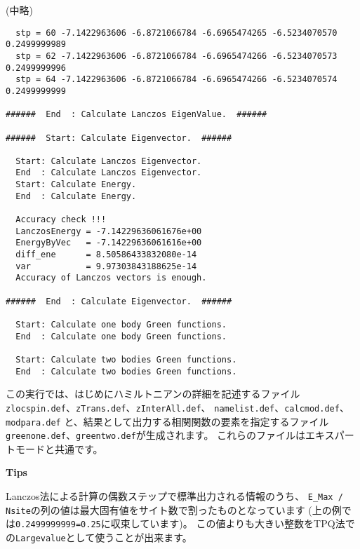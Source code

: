 \normalsize
(中略)
\small
\begin{verbatim}
  stp = 60 -7.1422963606 -6.8721066784 -6.6965474265 -6.5234070570 0.2499999989 
  stp = 62 -7.1422963606 -6.8721066784 -6.6965474266 -6.5234070573 0.2499999996 
  stp = 64 -7.1422963606 -6.8721066784 -6.6965474266 -6.5234070574 0.2499999999 

######  End  : Calculate Lanczos EigenValue.  ######

######  Start: Calculate Eigenvector.  ######

  Start: Calculate Lanczos Eigenvector.
  End  : Calculate Lanczos Eigenvector.
  Start: Calculate Energy.
  End  : Calculate Energy.

  Accuracy check !!!
  LanczosEnergy = -7.14229636061676e+00 
  EnergyByVec   = -7.14229636061616e+00 
  diff_ene      = 8.50586433832080e-14 
  var           = 9.97303843188625e-14 
  Accuracy of Lanczos vectors is enough.

######  End  : Calculate Eigenvector.  ######

  Start: Calculate one body Green functions.
  End  : Calculate one body Green functions.

  Start: Calculate two bodies Green functions.
  End  : Calculate two bodies Green functions.

\end{verbatim}
\normalsize

この実行では、はじめにハミルトニアンの詳細を記述するファイル
\verb|zlocspin.def|、\verb|zTrans.def|、\verb|zInterAll.def|、
\verb|namelist.def|、\verb|calcmod.def|、\verb|modpara.def|
と、結果として出力する相関関数の要素を指定するファイル
\verb|greenone.def|、\verb|greentwo.def|が生成されます。
これらのファイルはエキスパートモードと共通です。

\begin{screen}
\Large 
{\bf Tips}
\normalsize

Lanczos法による計算の偶数ステップで標準出力される情報のうち、
\verb|E_Max / Nsite|の列の値は最大固有値をサイト数で割ったものとなっています
(上の例では\verb|0.2499999999=0.25|に収束しています)。
この値よりも大きい整数をTPQ法での\verb|Largevalue|として使うことが出来ます。

\end{screen}

